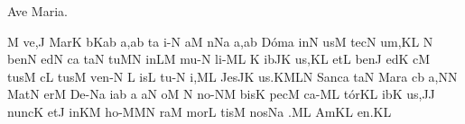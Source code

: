 \beginhymn Ave Maria.

\Internote
\nosolesmescustos
\initiumgregorianum
{}%
\sgn {}{-}{}\punctum M\egn
\sgn ve,\punctum J\egn
\spatium
\sgn Ma{r}\punctum K\egn
\sgn {}{\'\i}{-}\bmolle b\scandicus Kab\egn
\sgn {}a,\punctum a\augmentum b\egn
\spatium
\divisiominima\asteriscus\spatium
t\punctum a\egn
\sgn {}i{-}\punctum N\egn
\sgn {}a{}\punctum M\egn
\spatium
{}n\pes Na\egn
\sgn {}a,\punctum a\augmentum b\egn
\spatium
\sgn D{\'o}{m}\punctum a\egn
\sgn {}i{n}\punctum N\egn
\sgn {}us\punctum M\egn
\spatium
\sgn t{e}{c}\punctum N\egn
\sgn {}u{m,}\punctum K\augmentum L\egn
\spatium
\divisiominor
\spatium
\custos N
\lineaproxima
\sgn be{n}\punctum N\egn
\sgn {}e{d}\punctum N\egn
\sgn {}{\'\i}c\punctum a\egn
\sgn ta{}\punctum N\egn
\spatium
\sgn tu{}\punctum M\augmentum N\egn
\spatium
\sgn {}in\pes LM\egn
\spatium
\sgn mu{-}\punctum N\egn
\sgn li{-}\clivis ML\egn
{}\punctum K\egn
\sgn {}i{b}\pes JK\egn
\sgn {}u{s,}\punctum K\augmentum L\egn
\spatium
\divisiominor
\spatium
\sgn {}et\punctum L\egn
\spatium
\sgn be{n}\punctum J\egn
\sgn {}e{d}\punctum K\egn
\sgn {}{\'\i}c\punctum M\egn
\sgn tus\punctum M\egn
\spatium
{}c\punctum L\egn
\sgn tus\punctum M\egn
\spatium
\sgn v{e}{n-}\punctum N\egn
\custos L
\lineaproxima
{}is\punctum L\egn
\spatium
\sgn t{u}{-}\punctum N\egn
\sgn {}i,\clivis ML\egn
\spatium
\sgn J{e}{s}\pes JK\egn
\sgn {}u{s.}\pes KM\augmentumduplex LN\egn
\spatium
\divisiofinalis
\spatium
\sgn Sa{nc}\punctum a\egn
\sgn ta{}\punctum N\egn
\spatium
\sgn Ma{r}\punctum a\egn
\sgn {}{\'\i}{-}\clivis cb\egn
\sgn {}a,\punctum N\augmentum N\egn
\spatium
\sgn M{a}{t}\punctum N\egn
\sgn {}er\punctum M\egn
\spatium
\sgn D{e}{-}\pes Na\egn
\sgn {}i{}\punctum a\augmentum b\egn
\spatium\divisiominor\spatium
\punctum a\egn
\sgn {}a{}\punctum N\egn
\spatium
{}o{}\punctum M\egn
\spatium
\custos N
\lineaproxima
\sgn n{o}{-}\clivis NM\egn
\sgn bis\punctum K\egn
\spatium
\sgn pec\punctum M\egn
\sgn ca{-}\clivis ML\egn
\sgn t{\'o}{r}\pes KL\egn
\sgn {}i{b}\punctum K\egn
\sgn {}u{s,}\punctum J\augmentum J\egn
\spatium\divisiominor\spatium
\sgn nu{nc}\punctum K\egn
\spatium
\sgn {}et\punctum J\egn
\spatium
\sgn {}in\pes KM\egn
\spatium
\sgn h{o}{-}\punctum M\spatiumparvum\pes MN\egn
\sgn ra{}\punctum M\egn
\spatium
\sgn m{o}r\punctum L\egn
\sgn tis\punctum M\egn
\spatium
\sgn n{o}s\pes Na\egn
{}.\clivis ML\egn
\spatium
\sgn {}Am\punctum K\augmentum L\egn
\sgn {}e{n.}\punctum K\augmentum L\egn
\Finisgregoriana

\bigskip

